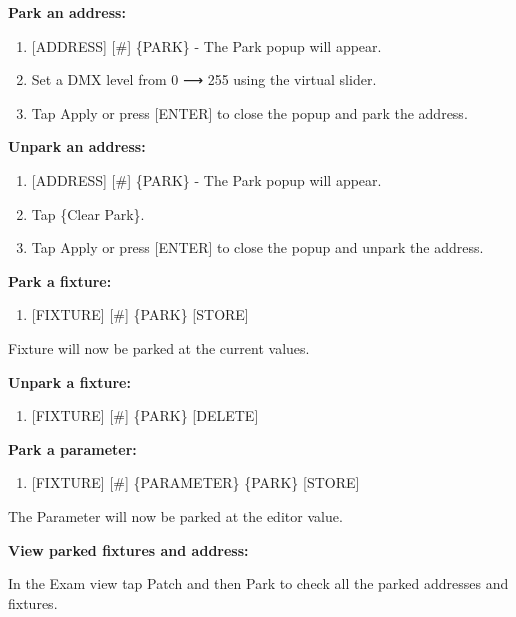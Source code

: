 \documentclass[
]{article}
\providecommand{\tightlist}{%
  \setlength{\itemsep}{0pt}\setlength{\parskip}{0pt}}
\begin{document}
\textbf{Park an address:}

\begin{enumerate}
\def\labelenumi{\arabic{enumi}.}
\item
  {[}ADDRESS{]} {[}\#{]} \{PARK\} - The Park popup will appear.
\item
  Set a DMX level from 0 ⟶ 255 using the virtual slider.
\item
  Tap Apply or press {[}ENTER{]} to close the popup and park the address.
\end{enumerate}

\textbf{Unpark an address:}

\begin{enumerate}
\def\labelenumi{\arabic{enumi}.}
\item
  {[}ADDRESS{]} {[}\#{]} \{PARK\} - The Park popup will appear.
\item
  Tap \{Clear Park\}.
\item
  Tap Apply or press {[}ENTER{]} to close the popup and unpark the address.
\end{enumerate}

\textbf{Park a fixture:}

\begin{enumerate}
\def\labelenumi{\arabic{enumi}.}
\tightlist
\item
  {[}FIXTURE{]} {[}\#{]} \{PARK\} {[}STORE{]}
\end{enumerate}

Fixture will now be parked at the current values.

\textbf{Unpark a fixture:}

\begin{enumerate}
\def\labelenumi{\arabic{enumi}.}
\tightlist
\item
  {[}FIXTURE{]} {[}\#{]} \{PARK\} {[}DELETE{]}
\end{enumerate}

\textbf{Park a parameter:}

\begin{enumerate}
\def\labelenumi{\arabic{enumi}.}
\tightlist
\item
  {[}FIXTURE{]} {[}\#{]} \{PARAMETER\} \{PARK\} {[}STORE{]}
\end{enumerate}

The Parameter will now be parked at the editor value.

\textbf{View parked fixtures and address:}

In the Exam view tap Patch and then Park to check all the parked addresses and fixtures.
\end{document}
